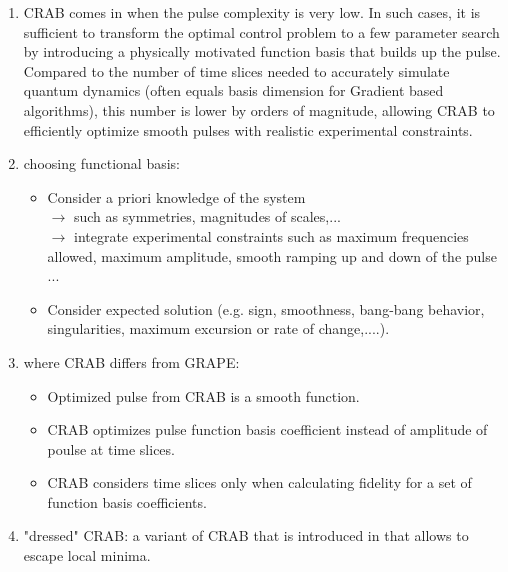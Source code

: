 \documentclass[12pt]{article}
\begin{document}
\begin{enumerate}
    \item CRAB comes in when the pulse complexity is very low. \cite{PhysRevLett.106.190501}\cite{PhysRevA.84.022326} In such cases, it is sufficient to transform the optimal control problem to a few parameter search by introducing a physically motivated function basis that builds up the pulse. 
        Compared to the number of time slices needed to accurately simulate quantum dynamics (often equals basis dimension for Gradient based algorithms), this number is lower by orders of magnitude, 
        allowing CRAB to efficiently optimize smooth pulses with realistic experimental constraints. 
    \item choosing functional basis: 
        \begin{itemize}
            \item Consider a priori knowledge of the system \\
                $\rightarrow$ such as symmetries, magnitudes of scales,... \\
                $\rightarrow$ integrate experimental constraints such as maximum frequencies allowed, maximum amplitude, smooth ramping up and down of the pulse ...
            \item Consider expected solution (e.g. sign, smoothness, bang-bang behavior, singularities, maximum excursion or rate of change,....).
        \end{itemize}
    \item where CRAB differs from GRAPE: 
        \begin{itemize}
            \item Optimized pulse from CRAB is a smooth function.
            \item CRAB optimizes pulse function basis coefficient instead of amplitude of poulse at time slices.
            \item CRAB considers time slices only when calculating fidelity for a set of function basis coefficients. 
        \end{itemize}
    \item "dressed" CRAB: a variant of CRAB that is introduced in \cite{PhysRevA.92.062343} that allows to escape local minima. 
\end{enumerate}
\end{document}
